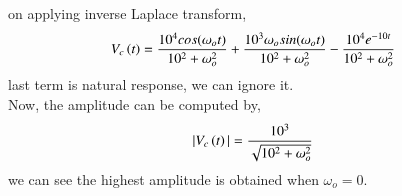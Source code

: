 \documentclass[journal,12pt,twocolumn]{IEEEtran}
\theoremstyle{remark}
\begin{document}
on applying inverse Laplace transform,
\begin{align}
V_c\left(t\right)&= \frac{10^4cos(\omega_o t)}{10^2+\omega_o^2}+\frac{10^3\omega_osin(\omega_o t)}{10^2+\omega_o^2}-\frac{10^4e^{-10t}}{10^2+\omega_o^2}
\end{align}
\vspace{5cm}
last term is natural response, we can ignore it.\\
Now, the amplitude can be computed by,
\begin{align}
|V_c\left(t\right)| &= \frac{10^3}{\sqrt{10^2+\omega_o^2}}
\end{align}
we can see the highest amplitude is obtained when $ \omega_o = 0$.
\end{document}

